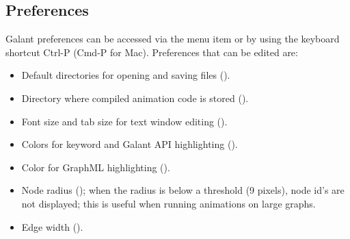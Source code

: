 \subsection{Preferences}
\label{sec:preferences}

Galant preferences can be accessed via the 
menu item or by using the keyboard shortcut \textsf{Ctrl-P}
(\textsf{Cmd-P} for Mac).
Preferences that can be edited are:
\begin{itemize}
\item
Default directories for opening and saving files ().
\item
Directory where compiled animation code is stored ().
\item
Font size and tab size for text window editing ().
\item
Colors for keyword and Galant API highlighting ().
\item
Color for GraphML highlighting ().
\item
Node radius ();
when the radius is below a threshold (9 pixels), node id's are not displayed;
this is useful when running animations on large graphs.
\item
Edge width ().
\end{itemize}


